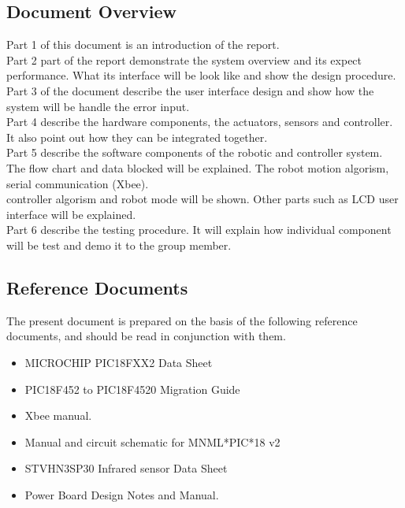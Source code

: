 \documentclass[MTRX3700report.tex]{subfiles}
\begin{document}
\subsection{Document Overview}

Part 1 of this document is an introduction of the report.\\
Part 2 part of the report demonstrate the system overview and its expect performance. What its interface will be look like and show the design procedure.\\
Part 3 of the document describe the user interface design and show how the system will be handle the error input.\\
Part 4 describe the hardware components, the actuators, sensors and controller. It also point out how they can be integrated together.\\
Part 5 describe the software components of the robotic and controller system. The flow chart and data blocked will be explained. The robot motion algorism, serial communication (Xbee).\\ controller algorism and robot mode will be shown. Other parts such as LCD user interface will be explained.\\
Part 6 describe the testing procedure. It will explain how individual component will be test and demo it to the group member.\\


\subsection{Reference Documents}
The present document is prepared on the basis of the following reference documents, and should be read in conjunction with them.\\
\begin {itemize}
	\item  MICROCHIP PIC18FXX2 Data Sheet
	\item  PIC18F452 to PIC18F4520 Migration Guide
	\item Xbee manual.
	\item Manual and circuit schematic for MNML*PIC*18 v2
	\item STVHN3SP30 Infrared sensor Data Sheet
	\item Power Board Design Notes and Manual.

\end{itemize}
\end{document}
